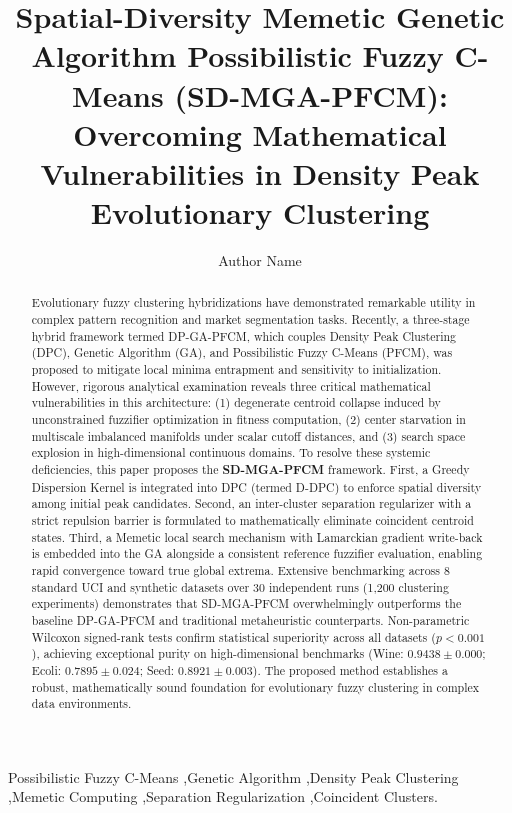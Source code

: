 \documentclass[preprint,12pt]{elsarticle}
\begin{document}
\begin{frontmatter}

\title{Spatial-Diversity Memetic Genetic Algorithm Possibilistic Fuzzy C-Means (SD-MGA-PFCM): Overcoming Mathematical Vulnerabilities in Density Peak Evolutionary Clustering}

\author[inst1]{Author Name}


\begin{abstract}
Evolutionary fuzzy clustering hybridizations have demonstrated remarkable utility in complex pattern recognition and market segmentation tasks. Recently, a three-stage hybrid framework termed DP-GA-PFCM, which couples Density Peak Clustering (DPC), Genetic Algorithm (GA), and Possibilistic Fuzzy C-Means (PFCM), was proposed to mitigate local minima entrapment and sensitivity to initialization. However, rigorous analytical examination reveals three critical mathematical vulnerabilities in this architecture: (1) degenerate centroid collapse induced by unconstrained fuzzifier optimization in fitness computation, (2) center starvation in multiscale imbalanced manifolds under scalar cutoff distances, and (3) search space explosion in high-dimensional continuous domains. To resolve these systemic deficiencies, this paper proposes the \textbf{SD-MGA-PFCM} framework. First, a Greedy Dispersion Kernel is integrated into DPC (termed D-DPC) to enforce spatial diversity among initial peak candidates. Second, an inter-cluster separation regularizer with a strict repulsion barrier is formulated to mathematically eliminate coincident centroid states. Third, a Memetic local search mechanism with Lamarckian gradient write-back is embedded into the GA alongside a consistent reference fuzzifier evaluation, enabling rapid convergence toward true global extrema. Extensive benchmarking across 8 standard UCI and synthetic datasets over 30 independent runs (1,200 clustering experiments) demonstrates that SD-MGA-PFCM overwhelmingly outperforms the baseline DP-GA-PFCM and traditional metaheuristic counterparts. Non-parametric Wilcoxon signed-rank tests confirm statistical superiority across all datasets ($p < 0.001$), achieving exceptional purity on high-dimensional benchmarks (Wine: $0.9438 \pm 0.000$; Ecoli: $0.7895 \pm 0.024$; Seed: $0.8921 \pm 0.003$). The proposed method establishes a robust, mathematically sound foundation for evolutionary fuzzy clustering in complex data environments.
\end{abstract}

\begin{keyword}
Possibilistic Fuzzy C-Means \sep Genetic Algorithm \sep Density Peak Clustering \sep Memetic Computing \sep Separation Regularization \sep Coincident Clusters.
\end{keyword}

\end{frontmatter}
\end{document}
